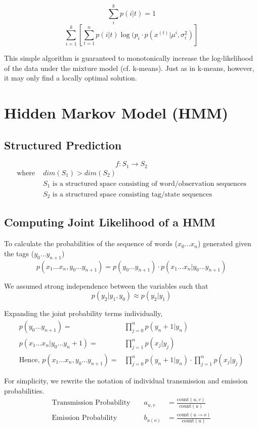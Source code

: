 \documentclass[a4paper]{article}
\begin{document}
$$\sum_i^k p(i|t) = 1$$
$$ \sum_{i=1}^k[\sum_{t=1}^n p(i|t)\log(p_i\cdot p(x^{(t)}|\mu^{i}, \sigma^2_i)] $$

\noindent This simple algorithm is guaranteed to monotonically increase the log-likelihood of the data under the mixture model (cf. k-means). Just as in k-means, however, it may only find a locally optimal solution.

\section{Hidden Markov Model (HMM)}

\subsection{Structured Prediction}

$$ f: S_1 \rightarrow S_2$$ 
\begin{align*}
\text{where } & dim(S_1) > dim(S_2)\\
& S_1 \text{ is a structured space consisting of word/observation sequences}\\
& S_2 \text{ is a structured space consisting tag/state sequences}
\end{align*}

\subsection{Computing Joint Likelihood of a HMM}

To calculate the probabilities of the sequence of words ($x_0...x_n$) generated given the tags ($y_0...y_{n+1}$)
$$ p(x_1...x_n, y_0...y_{n+1}) = p(y_0...y_{n+1}) \cdot p(x_1...x_n | y_0 ... y_{n+1}) $$

\noindent We assumed strong independence between the variables such that
$$ p(y_2 | y_1, y_0) \approx p(y_2 | y_1) $$

\noindent Expanding the joint probability terms individually, 
\begin{align*}
	p(y_0 ... y_{n+1}) =& \prod_{j=0}^n p(y_n+1 | y_n)\\
	p(x_1...x_n | y_0 ... y_n+1) =& \prod_{j=1}^n p(x_j|y_j)\\
	\text{Hence, } p(x_1...x_n, y_0...y_{n+1}) =& \prod_{j=0}^n p(y_n+1 | y_n) \cdot \prod_{j=1}^n p(x_j|y_j)
\end{align*}

\noindent For simplicity, we rewrite the notation of individual transmission and emission probabilities.
\begin{align*}
	\text{Transmission Probability } && a_{u,v} &= \frac{\text{count}(u,v)}{\text{count}(u)}\\
	\text{Emission Probability } && b_{u(o)} &= \frac{\text{count}(u\rightarrow o)}{\text{count}(u)}
\end{align*}
\end{document}
